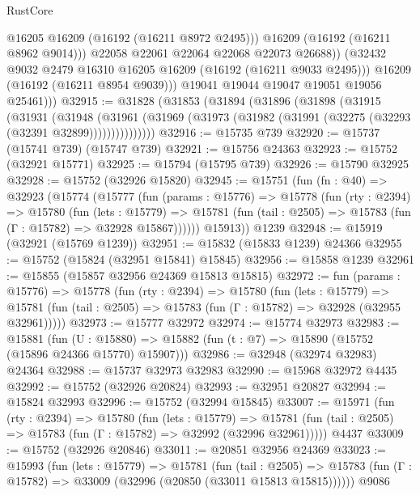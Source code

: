 \begin{lexlean}{RustCore}
\begin{coremodule}
                    @16205
                    @16209
                    (@16192 (@16211 @8972 @2495)))
                  @16209
                  (@16192 (@16211 @8962 @9014)))
                @22058
                @22061
                @22064
                @22068
                @22073
                @26688))
            (@32432 @9032 @2479 @16310 @16205 @16209 (@16192 (@16211 @9033 @2495)))
            @16209
            (@16192 (@16211 @8954 @9039)))
          @19041
          @19044
          @19047
          @19051
          @19056
          @25461)))
@32915 := @31828
    (@31853
      (@31894
        (@31896
          (@31898
            (@31915
              (@31931
                (@31948
                  (@31961
                    (@31969 (@31973 (@31982 (@31991 (@32275 (@32293 (@32391 @32899)))))))))))))))
@32916 := @15735 @739
@32920 := @15737 (@15741 @739) (@15747 @739)
@32921 := @15756 @24363
@32923 := @15752 (@32921 @15771)
@32925 := @15794 (@15795 @739)
@32926 := @15790 @32925
@32928 := @15752 (@32926 @15820)
@32945 := @15751
    (fun (fn : @40) =>
    @32923
      (@15774
        (@15777
          (fun (params : @15776) =>
          @15778
            (fun (rty : @2394) =>
            @15780
              (fun (lets : @15779) =>
              @15781 (fun (tail : @2505) => @15783 (fun (Γ : @15782) => @32928 @15867))))))
        @15913))
    @1239
@32948 := @15919 (@32921 (@15769 @1239))
@32951 := @15832 (@15833 @1239) @24366
@32955 := @15752 (@15824 (@32951 @15841) @15845)
@32956 := @15858 @1239
@32961 := @15855 (@15857 @32956 @24369 @15813 @15815)
@32972 := fun (params : @15776) =>
  @15778
    (fun (rty : @2394) =>
    @15780
      (fun (lets : @15779) =>
      @15781 (fun (tail : @2505) => @15783 (fun (Γ : @15782) => @32928 (@32955 @32961)))))
@32973 := @15777 @32972
@32974 := @15774 @32973
@32983 := @15881
    (fun (U : @15880) => @15882 (fun (t : @7) => @15890 (@15752 (@15896 @24366 @15770) @15907)))
@32986 := @32948 (@32974 @32983) @24364
@32988 := @15737 @32973 @32983
@32990 := @15968 @32972 @4435
@32992 := @15752 (@32926 @20824)
@32993 := @32951 @20827
@32994 := @15824 @32993
@32996 := @15752 (@32994 @15845)
@33007 := @15971
    (fun (rty : @2394) =>
    @15780
      (fun (lets : @15779) =>
      @15781 (fun (tail : @2505) => @15783 (fun (Γ : @15782) => @32992 (@32996 @32961)))))
    @4437
@33009 := @15752 (@32926 @20846)
@33011 := @20851 @32956 @24369
@33023 := @15993
    (fun (lets : @15779) =>
    @15781
      (fun (tail : @2505) =>
      @15783 (fun (Γ : @15782) => @33009 (@32996 (@20850 (@33011 @15813 @15815))))))
    @9086

\end{coremodule}
\end{lexlean}
